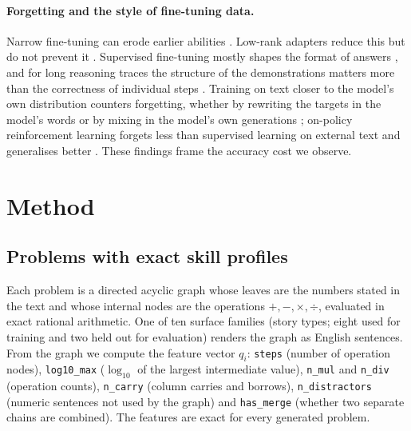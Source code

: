 \documentclass[11pt]{article}
\begin{document}
\paragraph{Forgetting and the style of fine-tuning data.}
Narrow fine-tuning can erode earlier abilities \citep{kirkpatrick2017ewc}. Low-rank adapters \citep{hu2021lora,
dettmers2023qlora} reduce this but do not prevent it \citep{biderman2024lora}. Supervised fine-tuning mostly shapes the
format of answers \citep{zhou2023lima}, and for long reasoning traces the structure of the demonstrations matters more
than the correctness of individual steps \citep{li2025structure}. Training on text closer to the model's own
distribution counters forgetting, whether by rewriting the targets in the model's words \citep{yang2024sdft} or by mixing
in the model's own generations \citep{sun2026talking}; on-policy reinforcement learning forgets less than supervised
learning on external text \citep{shenfeld2025razor} and generalises better \citep{chu2025sft}. These findings frame the
accuracy cost we observe.

\section{Method}

\subsection{Problems with exact skill profiles}
Each problem is a directed acyclic graph whose leaves are the numbers stated in the text and whose internal nodes are
the operations $+,-,\times,\div$, evaluated in exact rational arithmetic. One of ten surface families (story types;
eight used for training and two held out for evaluation) renders the graph as English sentences. From the graph we
compute the feature vector $q_i$: \texttt{steps} (number of operation nodes), \texttt{log10\_max} ($\log_{10}$ of the
largest intermediate value), \texttt{n\_mul} and \texttt{n\_div} (operation counts), \texttt{n\_carry} (column carries
and borrows), \texttt{n\_distractors} (numeric sentences not used by the graph) and \texttt{has\_merge} (whether two
separate chains are combined). The features are exact for every generated problem.
\end{document}
